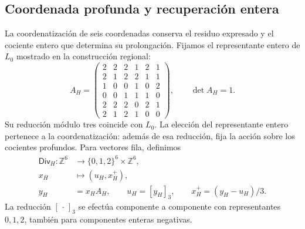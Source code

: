 \subsection{Coordenada profunda y recuperación entera}
\label{corpus9:xii:memoria-profunda}

La coordenatización de seis coordenadas conserva el residuo expresado y el cociente
entero que determina su prolongación. Fijamos el representante entero de
\(L_0\) mostrado en la construcción regional:
\begin{equation}
 A_H=\begin{pmatrix}
 2&2&2&1&2&1\\
 2&1&2&2&1&1\\
 1&0&0&1&0&2\\
 0&0&1&1&1&0\\
 2&2&2&0&2&1\\
 2&1&2&1&0&0
 \end{pmatrix},\qquad \det A_H=1.
 \label{corpus9:xii:matriz-profunda}
\end{equation}
Su reducción módulo tres coincide con \(L_0\). La elección del
representante entero pertenece a la coordenatización: además de esa reducción, fija
la acción sobre los cocientes profundos. Para vectores fila, definimos
\begin{equation}
 \begin{aligned}
 \mathsf{Div}_H:\mathbb Z^6&\longrightarrow
       \{0,1,2\}^6\times\mathbb Z^6,\\
 x_H&\longmapsto(u_H,x_H^+),\\
 y_H&=x_HA_H,\qquad u_H=[y_H]_3,\qquad
 x_H^+=(y_H-u_H)/3.
 \end{aligned}
 \label{corpus9:xii:division-profunda}
\end{equation}
La reducción \([\,\cdot\,]_3\) se efectúa componente a componente con
representantes \(0,1,2\), también para componentes enteras negativas.

